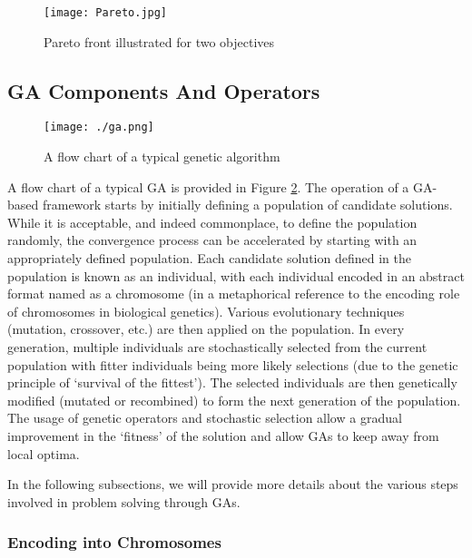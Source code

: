 \documentclass[journal]{IEEEtran}
\begin{document}
\begin{figure}[ht!]
\centering
\texttt{[image: Pareto.jpg]}
\caption{Pareto front illustrated for two objectives}
\label{fig:Pareto}
\end{figure}

\subsection{GA Components And Operators}



\begin{figure}[t]
\begin{center}
\texttt{[image: ./ga.png]}
\caption{A flow chart of a typical genetic algorithm \cite{qadir2013artificial}} 
\label{fig:ga}
\end{center}
\end{figure}

A flow chart of a typical GA is provided in Figure \ref{fig:ga}. The operation of a GA-based framework starts by initially defining a population of candidate solutions. While it is acceptable, and indeed commonplace, to define the population randomly, the convergence process can be accelerated by starting with an appropriately defined population. Each candidate solution defined in the population is known as an individual, with each individual encoded in an abstract format named as a chromosome (in a metaphorical reference to the encoding role of chromosomes in biological genetics). Various evolutionary techniques (mutation, crossover, etc.) are then applied on the population. In every generation, multiple individuals are stochastically selected from the current population with fitter individuals being more likely selections (due to the genetic principle of `survival of the fittest'). The selected individuals are then genetically modified (mutated or recombined) to form the next generation of the population. The usage of genetic operators and stochastic selection allow a gradual improvement in the `fitness' of the solution and allow GAs to keep away from local optima. 

In the following subsections, we will provide more details about the various steps involved in problem solving through GAs.

\vspace{2mm}
\subsubsection{Encoding into Chromosomes}
\end{document}

